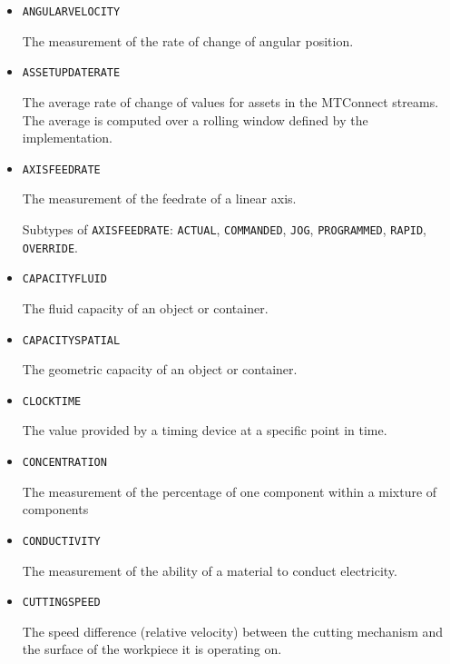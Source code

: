 \begin{itemize}
Negative rate of change of angular velocity.

Subtypes of \texttt{ANGULAR\textunderscore DECELERATION}: \texttt{ACTUAL}, \texttt{PROGRAMMED}, \texttt{COMMANDED}.

\item \texttt{ANGULAR\textunderscore VELOCITY}  

The measurement of the rate of change of angular position.


\item \texttt{ASSET\textunderscore UPDATE\textunderscore RATE}  

The average rate of change of values for assets in the MTConnect streams. The average is computed over a rolling window defined by the implementation.


\item \texttt{AXIS\textunderscore FEEDRATE}  

The measurement of the feedrate of a linear axis.

Subtypes of \texttt{AXIS\textunderscore FEEDRATE}: \texttt{ACTUAL}, \texttt{COMMANDED}, \texttt{JOG}, \texttt{PROGRAMMED}, \texttt{RAPID}, \texttt{OVERRIDE}.

\item \texttt{CAPACITY\textunderscore FLUID}  

The fluid capacity of an object or container.


\item \texttt{CAPACITY\textunderscore SPATIAL}  

The geometric capacity of an object or container.


\item \texttt{CLOCK\textunderscore TIME}  

The value provided by a timing device at a specific point in time.


\item \texttt{CONCENTRATION}  

The measurement of the percentage of one component within a mixture of components


\item \texttt{CONDUCTIVITY}  

The measurement of the ability of a material to conduct electricity.


\item \texttt{CUTTING\textunderscore SPEED}  

The speed difference (relative velocity) between the cutting mechanism and the surface of the workpiece it is operating on.


\end{itemize}
